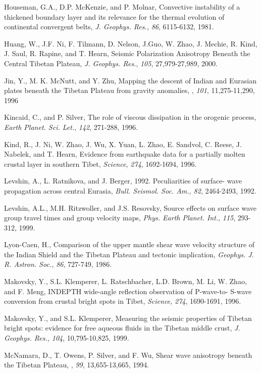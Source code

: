 \documentclass[12pt]{article}
\begin{document}
\begin{references}
Houseman, G.A., D.P. McKenzie, and P. Molnar, Convective instability
of a thickened boundary layer and its relevance for the thermal evolution of
continental convergent belts, {\it J. Geophys. Res.,} {\it 86}, 6115-6132, 1981.

Huang, W., J.F. Ni, F. Tilmann, D. Nelson, J.Guo, W. Zhao, J. Mechie,
R. Kind, J. Saul, R. Rapine, and T. Hearn, Seismic Polarization
Anisotropy Beneath the Central Tibetan Plateau, {\it J. Geophys. Res.},
{\it 105}, 27,979-27,989, 2000.

Jin, Y., M. K. McNutt, and Y. Zhu, Mapping the descent of Indian and
Eurasian plates beneath the Tibetan Plateau from gravity anomalies,
\jgr, {\it 101}, 11,275-11,290, 1996

Kincaid, C., and P. Silver, The role of viscous dissipation in the orogenic
process, {\it Earth Planet. Sci. Let.}, {\it 142}, 271-288, 1996.

Kind, R., J. Ni, W. Zhao, J. Wu, X. Yuan, L. Zhao, E. Sandvol, C. Reese,
J. Nabelek, and T. Hearn, Evidence from earthquake data for a partially
molten crustal layer in southern Tibet, {\it Science,} {\it 274}, 1692-1694,
1996.

Levshin, A., L. Ratnikova, and J. Berger, 1992. Peculiarities of surface-
wave propagation across central Eurasia, {\it Bull. Seismol. Soc. Am.,}
{\it 82}, 2464-2493, 1992.

Levshin, A.L., M.H. Ritzwoller, and J.S. Resovsky, Source effects on
surface wave group travel times and group velocity maps, {\it Phys.
Earth Planet. Int.}, {\it 115}, 293-312, 1999.

Lyon-Caen, H., Comparison of the upper mantle shear wave velocity
structure of the Indian Shield and the Tibetan Plateau and tectonic
implication, {\it Geophys. J. R. Astron. Soc.,} {\it 86}, 727-749, 1986.

Makovsky, Y., S.L. Klemperer, L. Ratschbacher, L.D. Brown, M. Li, W. Zhao,
and F. Meng, INDEPTH wide-angle reflection observation of P-wave-to-
S-wave conversion from crustal bright spots in Tibet, {\it Science,} {\it 274},
1690-1691, 1996.

Makovsky, Y., and S.L. Klemperer, Measuring the seismic properties
of Tibetan bright spots: evidence for free aqueous fluids in the Tibetan
middle crust, {\it J. Geophys. Res.,} {\it 104}, 10,795-10,825, 1999.

McNamara, D., T. Owens, P. Silver, and F. Wu, Shear wave
anisotropy beneath the Tibetan
Plateau, \jgr, {\it 99}, 13,655-13,665, 1994.


\end{references}
\end{document}
